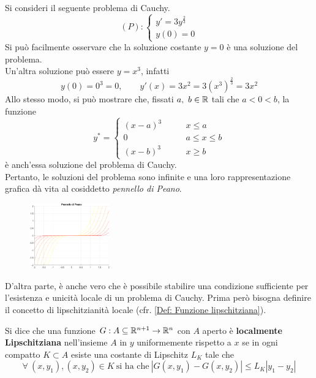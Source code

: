 \begin{example}
Si consideri il seguente problema di Cauchy.
\begin{equation*}
    (P):\begin{cases}
        y'=3y^{\frac{2}{3}}\\
        y(0)=0
    \end{cases}
\end{equation*}
Si può facilmente osservare che la soluzione costante $y=0$ è una soluzione del problema.\\
Un'altra soluzione può essere $y=x^3$, infatti
\begin{equation*}
    y(0)=0^3=0, \qquad y'(x)=3x^2=3(x^3)^\frac{2}{3}=3x^2
\end{equation*}
Allo stesso modo, si può mostrare che, fissati $a,\ b \in \mathbb{R}$ tali che $a<0<b$, la funzione
\begin{equation*}
y^*= \begin{cases}
    (x-a)^3 &\qquad x\leq a\\
    0 &\qquad a \leq x \leq b\\
    (x-b)^3 &\qquad x \geq b
\end{cases}
\end{equation*}
è anch'essa soluzione del problema di Cauchy.\\
Pertanto, le soluzioni del problema sono infinite e una loro rappresentazione grafica dà vita al cosiddetto \textit{pennello di Peano}.
\begin{figure}[H]
\centering
\includegraphics[width=0.31\textwidth]{Capitoli/Capitolo8/Pennello di Peano.png}
\end{figure}
\end{example}
D'altra parte, è anche vero che è possibile stabilire una condizione sufficiente per l'esistenza e unicità locale di un problema di Cauchy. Prima però bisogna definire il concetto di lipschitzianità locale (cfr. \ref{Def: Funzione lipschitziana}).
\begin{definition}
    Si dice che una funzione $G: A\subseteq \mathbb{R}^{n+1} \to \mathbb{R}^n$ con $A$ aperto è \textbf{localmente Lipschitziana} nell'insieme $A$ in $y$ uniformemente rispetto a $x$ se in ogni compatto $K \subset A$ esiste una costante di Lipschitz $L_K$ tale che
    \begin{equation}
        \forall\ (x, y_1), (x, y_2) \in K \ \text{si ha che}\ |G(x, y_1)-G(x, y_2)| \leq L_K |y_1-y_2|
    \end{equation}
\end{definition}
